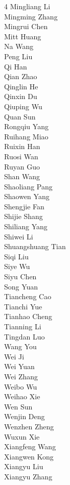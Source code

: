 \begin{multicols}{4}
Mingliang Li \\
Mingming Zhang \\
Mingrui Chen \\
Mitt Huang \\
Na Wang \\
Peng Liu \\
Qi Han \\
Qian Zhao \\
Qinglin He \\
Qinxin Du \\
Qiuping Wu \\
Quan Sun \\
Rongqiu Yang \\
Ruihang Miao \\
Ruixin Han \\
Ruosi Wan \\
Ruyan Guo \\
Shan Wang \\
Shaoliang Pang \\
Shaowen Yang \\
Shengjie Fan \\
Shijie Shang \\
Shiliang Yang \\
Shiwei Li \\
Shuangshuang Tian \\
Siqi Liu \\
Siye Wu \\
Siyu Chen \\
Song Yuan \\
Tiancheng Cao \\
Tianchi Yue \\
Tianhao Cheng \\
Tianning Li \\
Tingdan Luo \\
Wang You \\
Wei Ji \\
Wei Yuan \\
Wei Zhang \\
Weibo Wu \\
Weihao Xie \\
Wen Sun \\
Wenjin Deng \\
Wenzhen Zheng \\
Wuxun Xie \\
Xiangfeng Wang \\
Xiangwen Kong \\
Xiangyu Liu \\
Xiangyu Zhang \\

\end{multicols}
